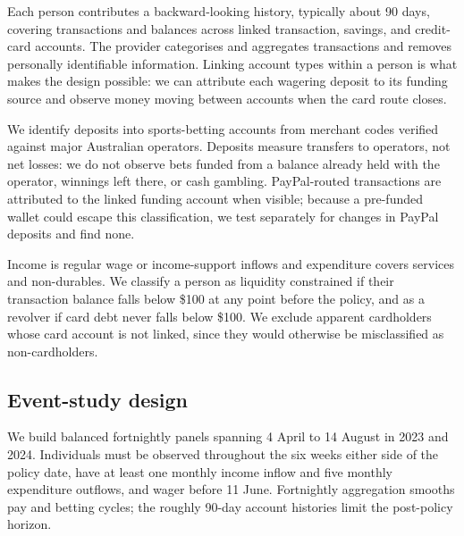 \documentclass[12pt]{article}
\begin{document}
Each person contributes a backward-looking history, typically about 90 days, covering transactions and balances across linked transaction, savings, and credit-card accounts. The provider categorises and aggregates transactions and removes personally identifiable information. Linking account types within a person is what makes the design possible: we can attribute each wagering deposit to its funding source and observe money moving between accounts when the card route closes.

We identify deposits into sports-betting accounts from merchant codes verified against major Australian operators. Deposits measure transfers to operators, not net losses: we do not observe bets funded from a balance already held with the operator, winnings left there, or cash gambling. PayPal-routed transactions are attributed to the linked funding account when visible; because a pre-funded wallet could escape this classification, we test separately for changes in PayPal deposits and find none.

Income is regular wage or income-support inflows and expenditure covers services and non-durables. We classify a person as liquidity constrained if their transaction balance falls below \$100 at any point before the policy, and as a revolver if card debt never falls below \$100. We exclude apparent cardholders whose card account is not linked, since they would otherwise be misclassified as non-cardholders.

\subsection{Event-study design}

We build balanced fortnightly panels spanning 4 April to 14 August in 2023 and 2024. Individuals must be observed throughout the six weeks either side of the policy date, have at least one monthly income inflow and five monthly expenditure outflows, and wager before 11 June. Fortnightly aggregation smooths pay and betting cycles; the roughly 90-day account histories limit the post-policy horizon.
\end{document}
